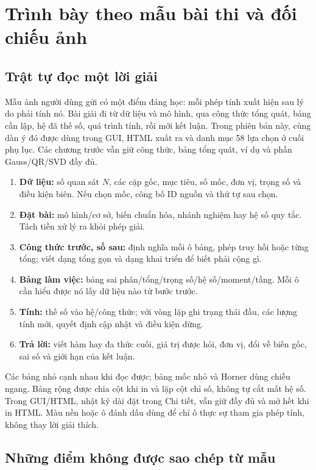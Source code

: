 \chapter{Trình bày theo mẫu bài thi và đối chiếu ảnh}
\label{ch:presentation}
\section{Trật tự đọc một lời giải}
Mẫu ảnh người dùng gửi có một điểm đáng học: mỗi phép tính xuất hiện sau lý do phải tính nó.
Bài giải đi từ dữ liệu và mô hình, qua công thức tổng quát, bảng cần lập, hệ đã thế số, quá trình tính, rồi mới kết luận.
Trong phiên bản này, cùng dàn ý đó được dùng trong GUI, HTML xuất ra và danh mục 58 lựa chọn ở cuối phụ lục.
Các chương trước vẫn giữ công thức, bảng tổng quát, ví dụ và phần Gauss/QR/SVD đầy đủ.

\begin{enumerate}
\item \textbf{Dữ liệu:} số quan sát $N$, các cặp gốc, mục tiêu, số mốc, đơn vị, trọng số và điều kiện biên. Nếu chọn mốc, công bố ID nguồn và thứ tự sau chọn.
\item \textbf{Đặt bài:} mô hình/cơ sở, biến chuẩn hóa, nhánh nghiệm hay hệ số quy tắc. Tách tiền xử lý ra khỏi phép giải.
\item \textbf{Công thức trước, số sau:} định nghĩa mỗi ô bảng, phép truy hồi hoặc từng tổng; viết dạng tổng gọn và dạng khai triển để biết phải cộng gì.
\item \textbf{Bảng làm việc:} bảng sai phân/tổng/trọng số/hệ số/moment/tầng. Mỗi ô cần hiểu được nó lấy dữ liệu nào từ bước trước.
\item \textbf{Tính:} thế số vào hệ/công thức; với vòng lặp ghi trạng thái đầu, các lượng tính mới, quyết định cập nhật và điều kiện dừng.
\item \textbf{Trả lời:} viết hàm hay đa thức cuối, giá trị được hỏi, đơn vị, đổi về biến gốc, sai số và giới hạn của kết luận.
\end{enumerate}
Các bảng nhỏ cạnh nhau khi đọc được; bảng mốc nhỏ và Horner dùng chiều ngang.
Bảng rộng được chia cột khi in và lặp cột chỉ số, không tự cắt mất hệ số.
Trong GUI/HTML, nhật ký dài đặt trong Chi tiết, vẫn giữ đầy đủ và mở hết khi in HTML.
Màu nền hoặc ô đánh dấu dùng để chỉ ô thực sự tham gia phép tính, không thay lời giải thích.

\section{Những điểm không được sao chép từ mẫu}
